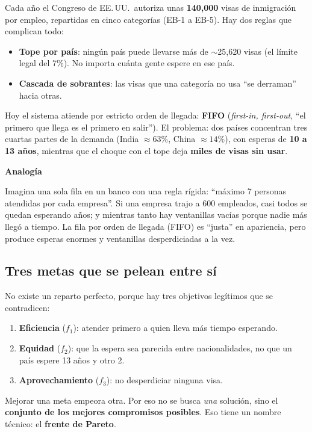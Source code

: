 \documentclass[11pt]{article}
\newcommand{\cajacolor}{cajadato}
\newenvironment{caja}[2]{%
  \par\medskip\noindent
  \renewcommand{\cajacolor}{#1}%
  \begin{lrbox}{\cajabox}%
  \begin{minipage}{\dimexpr\linewidth-2\fboxsep-1.2em\relax}%
  \setlength{\parskip}{0.5em}%
  {\bfseries\color{acento2}#2}\par\smallskip}
  {\end{minipage}%
  \end{lrbox}%
  \setlength{\fboxsep}{0.6em}%
  \colorbox{\cajacolor}{\usebox{\cajabox}}\par\medskip}
\newcommand{\analogia}[1]{\begin{caja}{cajaanalogia}{Analogía}#1\end{caja}}
\newcommand{\term}[1]{\textbf{\color{acento}#1}}
\begin{document}
Cada año el Congreso de EE.\,UU.\ autoriza unas \term{140{,}000} visas de inmigración por empleo, repartidas en cinco categorías (EB-1 a EB-5). Hay dos reglas que complican todo:

\begin{itemize}[leftmargin=1.4em]
  \item \term{Tope por país}: ningún país puede llevarse más de $\sim$25{,}620 visas (el límite legal del 7\%). No importa cuánta gente espere en ese país.
  \item \term{Cascada de sobrantes}: las visas que una categoría no usa ``se derraman'' hacia otras.
\end{itemize}

Hoy el sistema atiende por estricto orden de llegada: \term{FIFO} (\emph{first-in, first-out}, ``el primero que llega es el primero en salir''). El problema: dos países concentran tres cuartas partes de la demanda (India $\approx 63\%$, China $\approx 14\%$), con esperas de \textbf{10 a 13 años}, mientras que el choque con el tope deja \textbf{miles de visas sin usar}.

\analogia{
Imagina una sola fila en un banco con una regla rígida: ``máximo 7 personas atendidas por cada empresa''. Si una empresa trajo a 600 empleados, casi todos se quedan esperando años; y mientras tanto hay ventanillas vacías porque nadie más llegó a tiempo. La fila por orden de llegada (FIFO) es ``justa'' en apariencia, pero produce esperas enormes y ventanillas desperdiciadas a la vez.
}

\subsection{Tres metas que se pelean entre sí}

No existe un reparto perfecto, porque hay tres objetivos legítimos que se contradicen:

\begin{enumerate}[leftmargin=1.6em]
  \item \term{Eficiencia} ($f_1$): atender primero a quien lleva más tiempo esperando.
  \item \term{Equidad} ($f_2$): que la espera sea parecida entre nacionalidades, no que un país espere 13 años y otro 2.
  \item \term{Aprovechamiento} ($f_3$): no desperdiciar ninguna visa.
\end{enumerate}

Mejorar una meta empeora otra. Por eso no se busca \emph{una} solución, sino el \textbf{conjunto de los mejores compromisos posibles}. Eso tiene un nombre técnico: el \term{frente de Pareto}.
\end{document}
